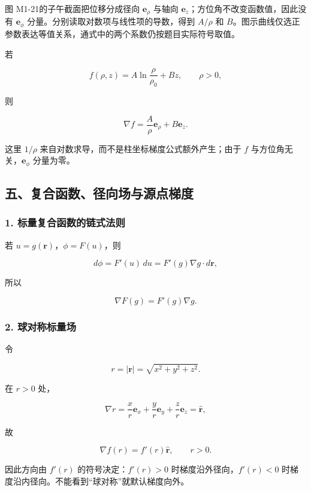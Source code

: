 图 M1-21的子午截面把位移分成径向 \(\mathbf e_{\rho}\) 与轴向
\(\mathbf e_z\)；方位角不改变函数值，因此没有 \(\mathbf e_{\phi}\)
分量。分别读取对数项与线性项的导数，得到 \(A/\rho\) 和
\(B\)。图示曲线仅选正参数表达等值关系，通式中的两个系数仍按题目实际符号取值。

若

\[
f(\rho,z)=A\ln\frac{\rho}{\rho_0}+Bz,
\qquad \rho>0,
\]

则

\[
\nabla f=\frac A\rho\mathbf e_{\rho}+B\mathbf e_z.
\]

这里 \(1/\rho\) 来自对数求导，而不是柱坐标梯度公式额外产生；由于 \(f\)
与方位角无关，\(\mathbf e_{\phi}\) 分量为零。

\subsection{五、复合函数、径向场与源点梯度}\label{m1:ux4e94ux590dux5408ux51fdux6570ux5f84ux5411ux573aux4e0eux6e90ux70b9ux68afux5ea6}

\subsubsection{1.
标量复合函数的链式法则}\label{m1:ux6807ux91cfux590dux5408ux51fdux6570ux7684ux94feux5f0fux6cd5ux5219}

若 \(u=g(\mathbf r)\)，\(\phi=F(u)\)，则

\[
d\phi=F'(u)\,du
=F'(g)\nabla g\cdot d\mathbf r,
\]

所以

\[
\boxed{
\nabla F(g)=F'(g)\nabla g
}.
\]

\subsubsection{2.
球对称标量场}\label{m1:ux7403ux5bf9ux79f0ux6807ux91cfux573a}

令

\[
r=|\mathbf r|=\sqrt{x^2+y^2+z^2}.
\]

在 \(r>0\) 处，

\[
\nabla r
=\frac{x}{r}\mathbf e_x
+\frac{y}{r}\mathbf e_y
+\frac{z}{r}\mathbf e_z
=\hat{\mathbf r},
\]

故

\[
\boxed{
\nabla f(r)=f'(r)\hat{\mathbf r}
},
\qquad r>0.
\]

因此方向由 \(f'(r)\) 的符号决定：\(f'(r)>0\) 时梯度沿外径向，\(f'(r)<0\)
时梯度沿内径向。不能看到``球对称''就默认梯度向外。

